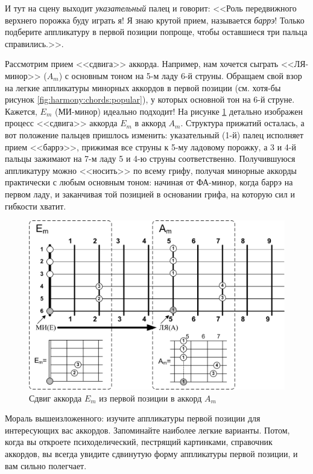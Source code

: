 И тут на сцену выходит \emph{указательный} палец и говорит: <<Роль передвижного верхнего порожка буду играть я! Я знаю крутой прием, называется \emph{баррэ}! Только подберите аппликатуру в первой позиции попроще, чтобы оставшиеся три пальца справились.>>.

Рассмотрим прием <<сдвига>> аккорда. Например, нам хочется сыграть <<ЛЯ-минор>> ($A_m$) с основным тоном на 5-м ладу 6-й струны. Обращаем свой взор на легкие аппликатуры минорных аккордов в первой позиции (см. хотя-бы рисунок \ref{fig:harmony:chords:popular}), у которых основной тон на 6-й струне. Кажется, $E_m$ (МИ-минор) идеально подходит! На рисунке \ref{fig:harmony:chords:shift} детально изображен процесс <<сдвига>> аккорда $E_m$ в аккорд $A_m$. Структура прижатий осталась, а вот положение пальцев пришлось изменить: указательный (1-й) палец исполняет прием <<баррэ>>, прижимая все струны к 5-му ладовому порожку, а 3 и 4-й пальцы зажимают на 7-м ладу 5 и 4-ю струны соответственно. Получившуюся аппликатуру можно <<носить>> по всему грифу, получая минорные аккорды практически с любым основным тоном: начиная от ФА-минор, когда баррэ на первом ладу, и заканчивая той позицией в основании грифа, на которую сил и гибкости хватит.

\begin{figure}[!ht]
    \centering
    \includegraphics[width=\textwidth]{fig/chords/shift} 
    \caption{Сдвиг аккорда $E_m$ из первой позиции в аккорд $A_m$}\label{fig:harmony:chords:shift}
\end{figure} 


Мораль вышеизложенного: изучите аппликатуры первой позиции для интересующих вас аккордов. Запоминайте наиболее легкие варианты. Потом, когда вы откроете психоделический, пестрящий картинками, справочник аккордов, вы всегда увидите сдвинутую форму аппликатуры первой позиции, и вам сильно полегчает.


